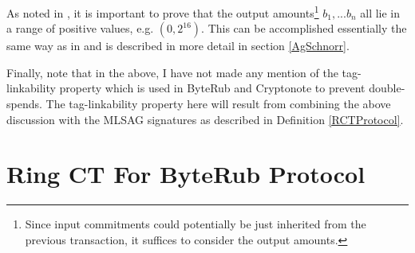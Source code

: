 \documentclass[12pt,oneside,english]{amsart}
\numberwithin{equation}{section}
\numberwithin{figure}{section}
\theoremstyle{plain}
\theoremstyle{plain}
\theoremstyle{remark}
\theoremstyle{plain}
\theoremstyle{remark}
\theoremstyle{remark}
\theoremstyle{plain}
\theoremstyle{definition}
\begin{document}
As noted in \cite{GM}, it is important to prove that the output amounts\footnote{Since input commitments could potentially be just inherited from the
previous transaction, it suffices to consider the output amounts.}
$b_{1},...b_{n}$ all lie in a range of positive values, e.g. $(0,2^{16}).$
This can be accomplished essentially the same way as in \cite{GM} and is described in more detail in section \ref{AgSchnorr}.
\begin{comment}
\begin{itemize}
\item Write each output amount $b_i$ as 
\[
 b_i = \delta_{ij}
\]

\item Prove first $C_{out-i}^{\left(j\right)}\in\left\{ 0,2^{j}\right\} $
for all $j\in\left\{ 0,1,...,16\right\} .$ This is done as in \cite{GM}:
for example, $C_{out-i}^{0}=y_{i}^{0}G+b_{i}^{0}H$ where $b_{i}^{0}\in\left\{ 0,1\right\} $.
Let 
\[
C_{out-i}^{\prime0}=C_{out-i}^{0}-H=y_{i}G+b_{i}^{0}H-H
\]
 so that if $b_{i}^{0}=0$, then $C_{out}^{\prime0}=y_{i}G$ and if
$b_{i}^{0}=1$, then $C_{out}^{0}=y_{i}G$, and in either case, the
ring signature on $\left\{ C_{out}^{0},C_{out}^{\prime0}\right\} $
can be signed for. 
\item By carefully choosing the blinding values (i.e. ensuring that $\sum_{j}y_{i}^{j}=y_{i}$ for each $j$), define 
\[
C_{out-i}=\sum_{j=1}^{16}C_{out-i}^{\left(j\right)}
\]
\item By homomorphicity of the commitments, $b_{i}=\sum_{j}\delta_{ji}2^{j}$,
where $\delta_{ji}$ is the $j^{th}$ digit in the binary expansion
of $b_{i}$. 
\end{itemize}
Thus in total, by the above, the sum of inputs into a transaction
equals the outputs, yet the specific input (and it's index!) is hidden.
In addition, the outputs are positive values. 
\end{comment}

Finally, note that in the above, I have not made any mention of the tag-linkability property which is used in ByteRub and Cryptonote to prevent double-spends. The tag-linkability property here will result from combining the above discussion with the MLSAG signatures as described in Definition \ref{RCTProtocol}.


\section{\label{sec:Ring-CT-ForByteRub}Ring CT For ByteRub Protocol}
\end{document}
